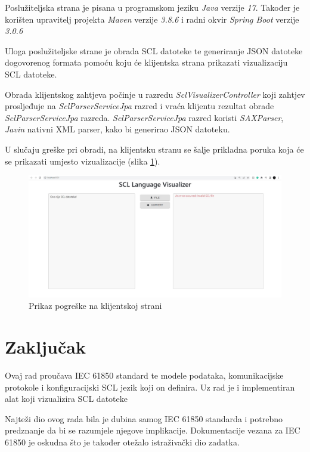 \documentclass[times, utf8, zavrsni]{fer}
\begin{document}
\bigskip
Poslužiteljska strana je pisana u programskom jeziku \textit{Java} verzije \textit{17}. Također je korišten upravitelj projekta \textit{Maven} verzije \textit{3.8.6} i radni okvir \textit{Spring Boot} verzije \textit{3.0.6}

Uloga poslužiteljske strane je obrada SCL datoteke te generiranje JSON datoteke dogovorenog formata pomoću koju će klijentska strana prikazati vizualizaciju SCL datoteke.

Obrada klijentskog zahtjeva počinje u razredu \textit{SclVisualizerController} koji zahtjev prosljeđuje na \textit{SclParserServiceJpa} razred i vraća klijentu rezultat obrade \textit{SclParserServiceJpa} razreda. \textit{SclParserServiceJpa} razred koristi \textit{SAXParser}, \textit{Javin} nativni XML parser, kako bi generirao JSON datoteku.

U slučaju greške pri obradi, na klijentsku stranu se šalje prikladna poruka koja će se prikazati umjesto vizualizacije (slika \ref{fig:scl-error}).

\begin{figure}[tph]
    \centering
    \includegraphics[width=\textwidth]{img/SCL-Visualizer-error.jpg}
    \caption{Prikaz pogreške na klijentskoj strani}
    \label{fig:scl-error}
\end{figure}

\chapter{Zaključak}
Ovaj rad proučava IEC 61850 standard te modele podataka, komunikacijske protokole i konfiguracijski SCL jezik koji on definira. Uz rad je i implementiran alat koji vizualizira SCL datoteke

Najteži dio ovog rada bila je dubina samog IEC 61850 standarda i potrebno predznanje da bi se razumjele njegove implikacije. Dokumentacije vezana za IEC 61850 je oskudna što je također otežalo istraživački dio zadatka.
\end{document}

